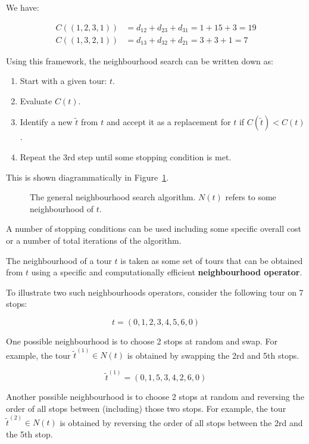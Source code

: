 We have:

\begin{eqnarray*}
    C((1, 2, 3, 1)) &= d_{12} + d_{23} + d_{31} = 1 + 15 + 3 = 19\\
    C((1, 3, 2, 1)) &= d_{13} + d_{32} + d_{21} = 3 + 3 + 1 = 7
\end{eqnarray*}

Using this framework, the neighbourhood search can be written down as:

\begin{enumerate}
    \item Start with a given tour: \(t\).
    \item Evaluate \(C(t)\).
    \item Identify a new \(\tilde t\) from \(t\) and accept it as a replacement
        for \(t\) if \(C(\tilde t)< C(t)\).
    \item Repeat the 3rd step until some stopping condition is met.
\end{enumerate}

This is shown diagrammatically in Figure~\ref{fig:tsp}.

\begin{figure}[!hbtp]
    \begin{center}
        
    \end{center}
    \caption{The general neighbourhood search algorithm. \(N(t)\) refers to some
    neighbourhood of \(t\).}
    \label{fig:tsp}
\end{figure}

A number of stopping conditions can be used including some specific
overall cost or a number of total iterations of the algorithm.

The neighbourhood of a tour \(t\) is taken as some set of tours that can be
obtained from \(t\) using a specific and computationally efficient
\textbf{neighbourhood operator}.

To illustrate two such neighbourhoods operators, consider the following tour on
7 stops:

\[
    t = (0, 1, 2, 3, 4, 5, 6, 0)
\]

One possible neighbourhood is to choose 2 stops at random and swap. For
example, the tour \(\tilde t^{(1)}\in N(t)\) is obtained by swapping the 2rd and 5th
stops.

\[
    \tilde t^{(1)} = (0, 1, 5, 3, 4, 2, 6, 0)
\]

Another possible neighbourhood is to choose 2 stops at random and reversing the
order of all stops between (including) those two stops. For example, the tour
\(\tilde t^{(2)} \in N(t)\) is obtained by reversing the order of all stops between
the 2rd and the 5th stop.

